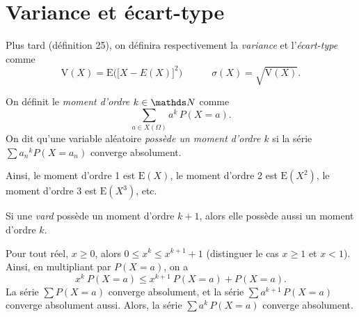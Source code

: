 \section{Variance et écart-type}

Plus tard (définition 25), on définira respectivement la \textit{variance} et l'\textit{écart-type} comme \[
  \mathrm{V}(X) = \mathrm{E}\Big(\big[X - E(X)\big]^2\Big)
  \quad\quad\quad
  \sigma(X) = \sqrt{\mathrm{V}(X)} 
.\]


\begin{defn}
  On définit le \textit{moment d'ordre $k \in \N$} comme \[
    \sum_{a \in X(\Omega)} a^k\, P(X = a)
  .\] On dit qu'une variable aléatoire \textit{possède un moment d'ordre $k$} si la série $\sum {a_n}^k P(X = a_n)$\/ converge absolument.

  Ainsi, le moment d'ordre 1 est  $\mathrm{E}(X)$, le moment d'ordre 2 est $\mathrm{E}(X^2)$, le moment d'ordre 3 est $\mathrm{E}(X^3)$, etc.
\end{defn}

\begin{lem}
  Si une \textit{vard} possède un moment d'ordre $k+1$, alors elle possède aussi un moment d'ordre $k$.
\end{lem}

\begin{prv}
  Pour tout réel, $x \ge 0$, alors $0 \le x^k \le x^{k+1} + 1$\/ (distinguer le cas $x \ge 1$\/ et $x < 1$). Ainsi, en multipliant par $P(X = a)$, on a \[
    x^k\:P(X = a) \le x^{k+1}\:P(X=a) + P(X = a)
  .\] La série $\sum P(X = a)$\/ converge absolument, et la série $\sum a^{k+1}\,P(X = a)$\/ converge absolument aussi. Alors, la série $\sum a^k\,P(X=a)$\/ converge absolument.
\end{prv}
